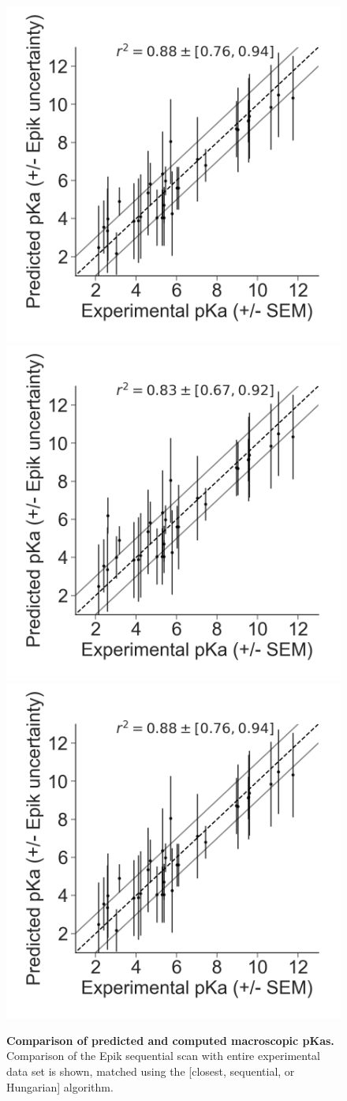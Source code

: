 \documentclass[9pt,lineno]{elife}
\begin{document}
\begin{figure}[H]
    \centering
    \includegraphics[width=0.31\linewidth]{Epik_macropKa_closest_pka.png} \\
    \includegraphics[width=0.31\linewidth]{Epik_macropKa_sequential_aligned_pka.png}
    \includegraphics[width=0.31\linewidth]{Epik_macropKa_hungarian_pka.png}
    \caption{{\bf Comparison of predicted and computed macroscopic pKas.}
    Comparison of the Epik sequential scan with entire experimental data set is shown, matched using the [closest, sequential, or Hungarian] algorithm.
    \label{fig:correlation-macro}}
\end{figure}
\end{document}

